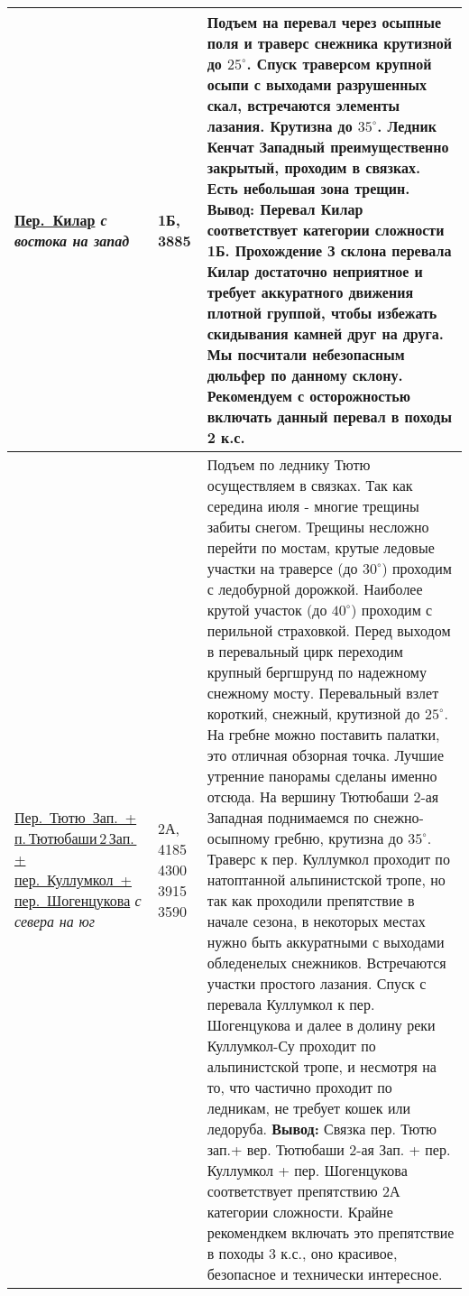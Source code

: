 {\begin{longtable}{|>{\centering\arraybackslash}m{3.8cm}|>{\centering\arraybackslash}m{1.3cm}|>{\raggedright\arraybackslash}m{12.5cm}|}
			\hyperref[subsec:Day16]{Пер.~Килар}																		\newline\textit{с востока на запад}		&	1Б, 3885					&	Подъем на перевал через осыпные поля и траверс снежника крутизной до $25^\circ$. Спуск траверсом крупной осыпи с выходами разрушенных скал, встречаются элементы лазания. Крутизна до $35^\circ$. Ледник Кенчат Западный преимущественно закрытый, проходим в связках. Есть небольшая зона трещин. \newline \textbf{Вывод:} Перевал Килар соответствует категории сложности 1Б. Прохождение З склона перевала Килар достаточно неприятное и требует аккуратного движения плотной группой, чтобы избежать скидывания камней друг на друга. Мы посчитали небезопасным дюльфер по данному склону. Рекомендуем с осторожностью включать данный перевал в походы 2 к.с.																																																																																																																																																																																																																																																																																																																																																	\\ \hline
			\hyperref[subsec:Day17]{Пер.~Тютю~Зап.~+ п.\,Тютюбаши\,2\,Зап.\,+ пер.~Куллумкол~+ пер.~Шогенцукова}	\newline\textit{с севера на юг}			&	2А,	4185 4300 3915 3590		&	Подъем по леднику Тютю осуществляем в связках. Так как середина июля - многие трещины забиты снегом. Трещины несложно перейти по мостам, крутые ледовые участки на траверсе (до $30^\circ$) проходим с ледобурной дорожкой. Наиболее крутой участок (до $40^\circ$) проходим с перильной страховкой. Перед выходом в перевальный цирк переходим крупный бергшрунд по надежному снежному мосту. Перевальный взлет короткий, снежный, крутизной до $25^\circ$. На гребне можно поставить палатки, это отличная обзорная точка. Лучшие утренние панорамы сделаны именно отсюда. На вершину Тютюбаши 2-ая Западная поднимаемся по снежно-осыпному гребню, крутизна до $35^\circ$. Траверс к пер. Куллумкол проходит по натоптанной альпинистской тропе, но так как проходили препятствие в начале сезона, в некоторых местах нужно быть аккуратными с выходами обледенелых снежников. Встречаются участки простого лазания. Спуск с перевала Куллумкол к пер. Шогенцукова и далее в долину реки Куллумкол-Су проходит по альпинистской тропе, и несмотря на то, что частично проходит по ледникам, не требует кошек или ледоруба. \newline \textbf{Вывод:} Связка пер. Тютю зап.+ вер. Тютюбаши 2-ая Зап. + пер. Куллумкол + пер. Шогенцукова соответствует препятствию 2А категории сложности. Крайне рекомендкем включать это препятствие в походы 3 к.с., оно красивое, безопасное и технически интересное.																																																																																																																																																														\\ \hline
		\end{longtable}}
		\setlength{\arraycolsep}{5pt}
		\renewcommand{\arraystretch}{1.8}

